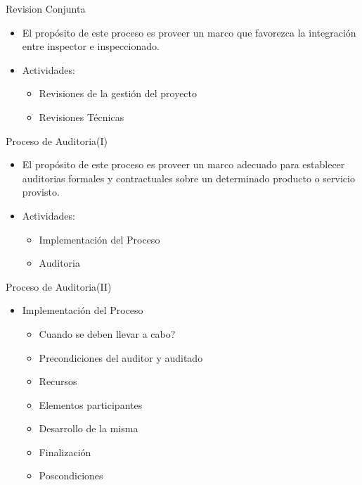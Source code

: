 \documentclass{beamer}
\begin{document}
				\begin{frame}{Revision Conjunta}
					\begin{itemize}
						\item El propósito de este proceso es proveer un marco que favorezca la integración entre inspector e inspeccionado.
						\item Actividades:
						
						\begin{itemize}
							\item Revisiones de la gestión del proyecto
							\item Revisiones Técnicas
						\end{itemize} 
					\end{itemize}
			
				\end{frame}
			
				\begin{frame}{Proceso de Auditoria(I)}
					\begin{itemize}
						\item El propósito de este proceso es proveer un marco adecuado para establecer auditorias formales y contractuales sobre un determinado producto o servicio provisto.
						\item Actividades:
						\begin{itemize}
							\item Implementación del Proceso
							\item Auditoria
						\end{itemize}

					\end{itemize}
				\end{frame}
			
			\begin{frame}{Proceso de Auditoria(II)}
			
			\begin{itemize}
			\item Implementación del Proceso
			
			\begin{itemize}
			\item Cuando se deben llevar a cabo?
			\item Precondiciones del auditor y auditado
			\item Recursos
			\item Elementos participantes
			\item Desarrollo de la misma
			\item Finalización
			\item Poscondiciones
			\end{itemize}

			\end{itemize}
			
			\end{frame}
			
\end{document}
